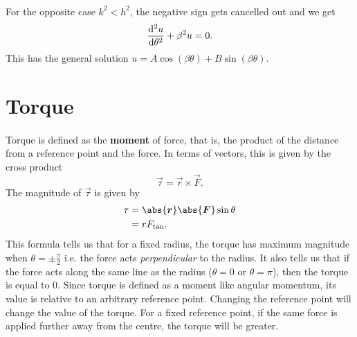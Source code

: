 \documentclass[../classical_mechanics.tex]{subfiles}
\begin{document}
\begin{example}
            \paragraph{}
            For the opposite case $k^2<h^2$, the negative sign gets cancelled out and we get
            \begin{equation}
                \dv[2]{u}{\theta}+\beta^2 u=0.
            \end{equation}
            This has the general solution $u=A\cos(\beta\theta)+B\sin(\beta\theta)$.

        \end{example}

    \section{Torque}\label{sec:torque}
        \paragraph{}
        Torque is defined as the \textbf{moment} of force, that is, the product of the distance from a reference point and the force.
        In terms of vectors, this is given by the cross product
        \begin{equation}
            \vec{\tau}=\vec{r}\times\vec{F}.
        \end{equation}
        The magnitude of $\vec{\tau}$ is given by
        \begin{align}
            \tau&=\abs{\vec{r}}\abs{\vec{F}}\sin\theta\\
            &=rF_\text{tan}.
        \end{align}
        This formula tells us that for a fixed radius, the torque has maximum magnitude when $\theta=\pm\frac{\pi}{2}$ i.e. the force acts \textit{perpendicular} to the radius.
        It also tells us that if the force acts along the same line as the radius ($\theta=0$ or $\theta=\pi$), then the torque is equal to 0.
        Since torque is defined as a moment like angular momentum, its value is relative to an arbitrary reference point.
        Changing the reference point will change the value of the torque.
        For a fixed reference point, if the same force is applied further away from the centre, the torque will be greater.
        
\end{document}
